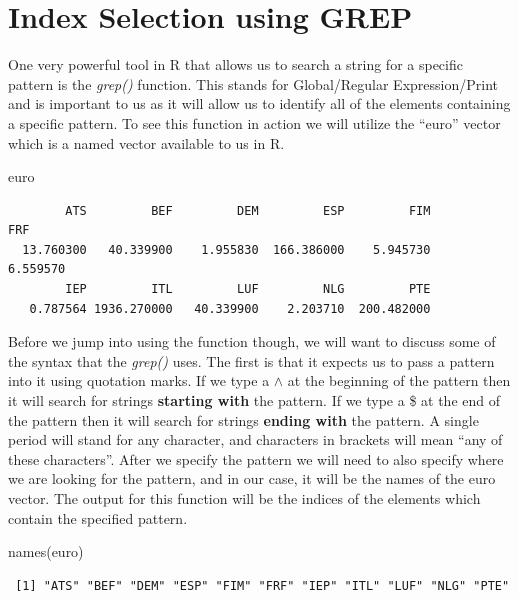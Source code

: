 \documentclass[
  letterpaper,
  DIV=11,
  numbers=noendperiod]{scrreprt}
\newenvironment{Shaded}{\begin{snugshade}}{\end{snugshade}}
\newcommand{\FunctionTok}[1]{\textcolor[rgb]{0.28,0.35,0.67}{#1}}
\newcommand{\NormalTok}[1]{\textcolor[rgb]{0.00,0.23,0.31}{#1}}
\begin{document}
\section{Index Selection using GREP}\label{index-selection-using-grep}

One very powerful tool in R that allows us to search a string for a
specific pattern is the \emph{grep()} function. This stands for
Global/Regular Expression/Print and is important to us as it will allow
us to identify all of the elements containing a specific pattern. To see
this function in action we will utilize the ``euro'' vector which is a
named vector available to us in R.

\begin{Shaded}
\begin{Highlighting}[]
\NormalTok{euro}
\end{Highlighting}
\end{Shaded}

\begin{verbatim}
        ATS         BEF         DEM         ESP         FIM         FRF 
  13.760300   40.339900    1.955830  166.386000    5.945730    6.559570 
        IEP         ITL         LUF         NLG         PTE 
   0.787564 1936.270000   40.339900    2.203710  200.482000 
\end{verbatim}

Before we jump into using the function though, we will want to discuss
some of the syntax that the \emph{grep()} uses. The first is that it
expects us to pass a pattern into it using quotation marks. If we type a
\(\wedge\) at the beginning of the pattern then it will search for
strings \textbf{starting with} the pattern. If we type a \$ at the end
of the pattern then it will search for strings \textbf{ending with} the
pattern. A single period will stand for any character, and characters in
brackets will mean ``any of these characters''. After we specify the
pattern we will need to also specify where we are looking for the
pattern, and in our case, it will be the names of the euro vector. The
output for this function will be the indices of the elements which
contain the specified pattern.

\begin{Shaded}
\begin{Highlighting}[]
\FunctionTok{names}\NormalTok{(euro)}
\end{Highlighting}
\end{Shaded}

\begin{verbatim}
 [1] "ATS" "BEF" "DEM" "ESP" "FIM" "FRF" "IEP" "ITL" "LUF" "NLG" "PTE"
\end{verbatim}
\end{document}
